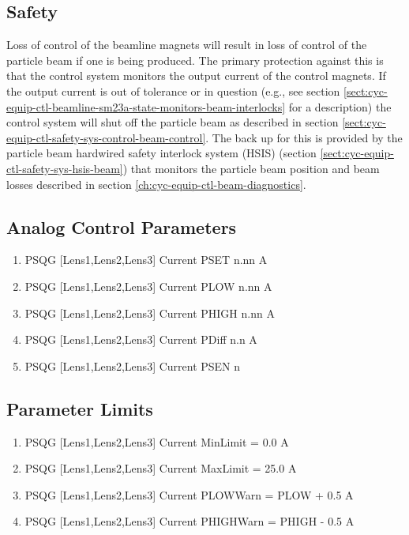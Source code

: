 \documentclass[11pt]{book}		%
\begin{document}
\subsection{Safety}\label{sect:cyc-op-interface-status-beamline-tofc1-safety}

Loss of control of the beamline magnets will result in loss of control of the particle beam if one is being produced.  The primary protection against this is that the control system monitors the output current of the control magnets.  If the output current is out of tolerance or in question (e.g., see section \ref{sect:cyc-equip-ctl-beamline-sm23a-state-monitors-beam-interlocks} for a description) the control system will shut off the particle beam as described in section \ref{sect:cyc-equip-ctl-safety-sys-control-beam-control}.  The back up for this is provided by the particle beam hardwired safety interlock system (HSIS) (section \ref{sect:cyc-equip-ctl-safety-sys-hsis-beam}) that monitors the particle beam position and beam losses described in section \ref{ch:cyc-equip-ctl-beam-diagnostics}.

\subsection{Analog Control Parameters}\label{sect:cyc-op-interface-status-beamline-tofc1-analog-control}


\begin{enumerate}
 \item PSQG [Lens1,Lens2,Lens3] Current PSET  n.nn A
 \item PSQG [Lens1,Lens2,Lens3] Current PLOW  n.nn A
 \item PSQG [Lens1,Lens2,Lens3] Current PHIGH n.nn A
 \item PSQG [Lens1,Lens2,Lens3] Current PDiff n.n A
 \item PSQG [Lens1,Lens2,Lens3] Current PSEN  n
\end{enumerate}

\subsection{Parameter Limits} \label{sect:cyc-op-interface-status-beamline-tofc1-analog-control-limits}

\begin{enumerate}
 \item PSQG [Lens1,Lens2,Lens3] Current MinLimit = 0.0 A
 \item PSQG [Lens1,Lens2,Lens3] Current MaxLimit = 25.0 A
 \item PSQG [Lens1,Lens2,Lens3] Current PLOWWarn = PLOW + 0.5 A
 \item PSQG [Lens1,Lens2,Lens3] Current PHIGHWarn = PHIGH - 0.5 A
\end{enumerate}
\end{document}
